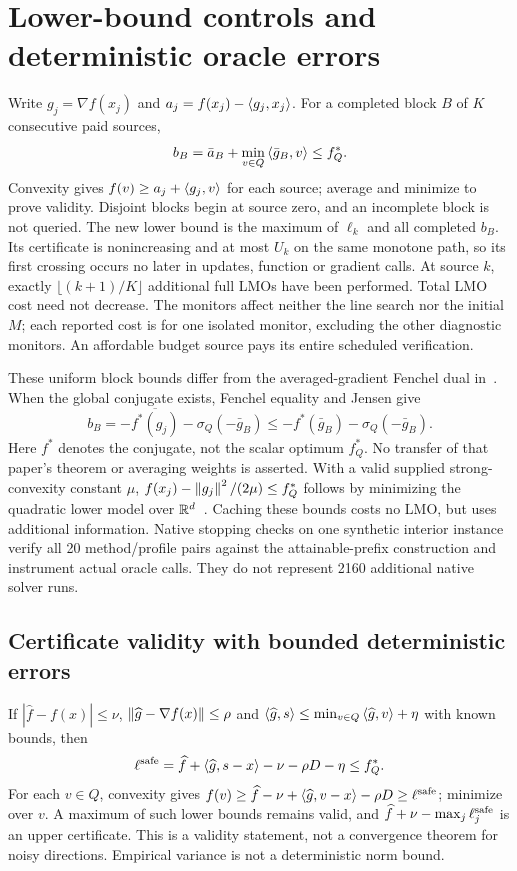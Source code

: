 \section{Lower-bound controls and deterministic oracle errors}
\label{app:monitors}
Write $g_j=\nabla f(x_j)$ and $a_j=f(x_j)-\left\langle g_j,x_j\right\rangle$.
For a completed block $B$ of $K$ consecutive paid sources,
\[
 b_B=\bar a_B+\min_{v\in Q}\left\langle\bar g_B,v\right\rangle\le f_Q^*.
\]
Convexity gives $f(v)\ge a_j+\left\langle g_j,v\right\rangle$ for each source;
average and minimize to prove validity. Disjoint blocks begin at
source zero, and an incomplete block is not queried. The new lower
bound is the maximum of $\ell_k$ and all completed $b_B$.
Its certificate is nonincreasing and at most $U_k$ on the same
monotone path, so its first crossing occurs no later in updates,
function or gradient calls. At source $k$, exactly
$\lfloor(k+1)/K\rfloor$ additional full LMOs have been performed.
Total LMO cost need not decrease. The monitors affect neither the
line search nor the initial $M$; each reported cost is for one
isolated monitor, excluding the other diagnostic monitors.
An affordable budget source pays its entire scheduled verification.

These uniform block bounds differ from the averaged-gradient Fenchel
dual in~\cite[Theorem 3]{pedregosa}. When the global conjugate exists,
Fenchel equality and Jensen give
\[
 b_B=-\overline{f^*(g_j)}-\sigma_Q(-\bar g_B)
     \le-f^*(\bar g_B)-\sigma_Q(-\bar g_B).
\]
Here $f^*$ denotes the conjugate, not the scalar optimum $f_Q^*$.
No transfer of that paper's theorem or averaging weights is asserted.
With a valid supplied strong-convexity constant $\mu$,
$f(x_j)-\left\|g_j\right\|^2/(2\mu)\le f_Q^*$ follows by minimizing the
quadratic lower model over $\mathbb R^d$~\cite[Appendix B]{karimi}.
Caching these bounds costs no LMO, but uses additional information.
Native stopping checks on one synthetic interior instance verify all
20 method/profile pairs against the attainable-prefix construction
and instrument actual oracle calls. They do not represent 2160
additional native solver runs.

\subsection{Certificate validity with bounded deterministic errors}
\label{app:inexact}
If $|\widehat f-f(x)|\le\nu$,
$\left\|\widehat g-\nabla f(x)\right\|\le\rho$ and
$\left\langle\widehat g,s\right\rangle\le\min_{v\in Q}\left\langle\widehat g,v\right\rangle+\eta$
with known bounds, then
\[
 \ell^{\rm safe}=\widehat f+\left\langle\widehat g,s-x\right\rangle
                      -\nu-\rho D-\eta\le f_Q^*.
\]
For each $v\in Q$, convexity gives
$f(v)\ge\widehat f-\nu+\left\langle\widehat g,v-x\right\rangle-\rho D
\ge\ell^{\rm safe}$; minimize over $v$.
A maximum of such lower bounds remains valid, and
$\widehat f+\nu-\max_j\ell_j^{\rm safe}$ is an upper certificate.
This is a validity statement, not a convergence theorem for noisy
directions. Empirical variance is not a deterministic norm bound.

